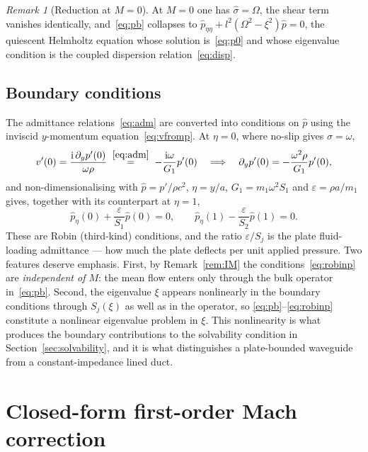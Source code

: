 \documentclass[11pt,a4paper]{article}
\newcommand{\Om}{\Omega}
\newcommand{\eps}{\varepsilon}
\newcommand{\ii}{\mathrm{i}}
\newcommand{\sig}{\hat\sigma}
\theoremstyle{plain}
\theoremstyle{remark}
\newtheorem{remark}[theorem]{Remark}
\begin{document}
\begin{remark}[Reduction at $M=0$]
At $M=0$ one has $\sig=\Om$, the shear term vanishes identically, and~\eqref{eq:pb} collapses to
$\hat p_{\eta\eta}+l^2(\Om^2-\xi^2)\hat p=0$, the quiescent Helmholtz equation whose solution
is~\eqref{eq:p0} and whose eigenvalue condition is the coupled dispersion relation~\eqref{eq:disp}.
\end{remark}

\subsection{Boundary conditions}
The admittance relations~\eqref{eq:adm} are converted into conditions on $\hat p$ using the
inviscid $y$-momentum equation~\eqref{eq:vfromp}. At $\eta=0$, where no-slip gives $\sigma=\omega$,
\begin{equation}
v'(0)=\frac{\ii\,\partial_yp'(0)}{\omega\rho}
\;\overset{\eqref{eq:adm}}{=}\;-\frac{\ii\omega}{G_1}p'(0)
\quad\Longrightarrow\quad
\partial_yp'(0)=-\frac{\omega^2\rho}{G_1}p'(0),
\end{equation}
and non-dimensionalising with $\hat p=p'/\rho c^2$, $\eta=y/a$, $G_1=m_1\omega^2S_1$ and
$\eps=\rho a/m_1$ gives, together with its counterpart at $\eta=1$,
\begin{equation}
\boxed{\;\hat p_\eta(0)+\frac{\eps}{S_1}\hat p(0)=0,
\qquad
\hat p_\eta(1)-\frac{\eps}{S_2}\hat p(1)=0.\;}
\label{eq:robinp}
\end{equation}
These are Robin (third-kind) conditions, and the ratio $\eps/S_j$ is the plate fluid-loading admittance
--- how much the plate deflects per unit applied pressure. Two features deserve emphasis. First,
by Remark~\ref{rem:IM} the conditions~\eqref{eq:robinp} are \emph{independent of $M$}: the mean flow
enters only through the bulk operator in~\eqref{eq:pb}. Second, the eigenvalue $\xi$ appears
nonlinearly in the boundary conditions through $S_j(\xi)$ as well as in the operator, so
\eqref{eq:pb}--\eqref{eq:robinp} constitute a nonlinear eigenvalue problem in $\xi$. This nonlinearity
is what produces the boundary contributions to the solvability condition in
Section~\ref{sec:solvability}, and it is what distinguishes a plate-bounded waveguide from a
constant-impedance lined duct.

\section{Closed-form first-order Mach correction}\label{sec:lowmach}
\end{document}
